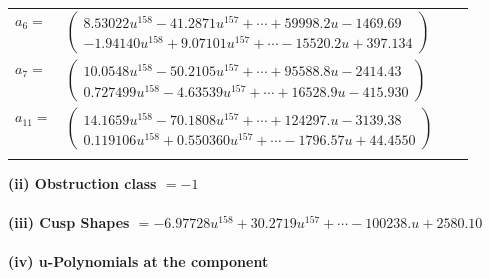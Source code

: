 \documentclass[1p]{elsarticle_modified}
\theoremstyle{definition}
\begin{document}
\begin{tabular}{m{7pt} m{180pt} m{7pt} m{180pt} }
\flushright $a_{6}=$&$\begin{pmatrix}8.53022 u^{158}-41.2871 u^{157}+\cdots+59998.2 u-1469.69\\-1.94140 u^{158}+9.07101 u^{157}+\cdots-15520.2 u+397.134\end{pmatrix}$ \\
\flushright $a_{7}=$&$\begin{pmatrix}10.0548 u^{158}-50.2105 u^{157}+\cdots+95588.8 u-2414.43\\0.727499 u^{158}-4.63539 u^{157}+\cdots+16528.9 u-415.930\end{pmatrix}$ \\
\flushright $a_{11}=$&$\begin{pmatrix}14.1659 u^{158}-70.1808 u^{157}+\cdots+124297. u-3139.38\\0.119106 u^{158}+0.550360 u^{157}+\cdots-1796.57 u+44.4550\end{pmatrix}$\\&\end{tabular}
\flushleft \textbf{(ii) Obstruction class $= -1$}\\~\\
\flushleft \textbf{(iii) Cusp Shapes $= -6.97728 u^{158}+30.2719 u^{157}+\cdots-100238. u+2580.10$}\\~\\
\newpage\renewcommand{\arraystretch}{1}
\flushleft \textbf{(iv) u-Polynomials at the component}\newline \\
\end{document}

